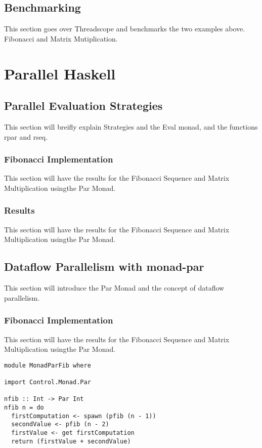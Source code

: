 \documentclass[a4paper, 10pt]{article}
\begin{document}
\subsection{Benchmarking}
This section goes over Threadscope and benchmarks the two examples above. Fibonacci and Matrix Mutiplication.

\section{Parallel Haskell}

\subsection{Parallel Evaluation Strategies}
This section will breifly explain Strategies and the Eval monad, and the functions rpar and rseq.

\subsubsection{Fibonacci Implementation}
This section will have the results for the Fibonacci Sequence and Matrix Multiplication usingthe Par Monad.

\subsubsection{Results}
This section will have the results for the Fibonacci Sequence and Matrix Multiplication usingthe Par Monad.

\subsection{Dataflow Parallelism with monad-par}
This section will introduce the Par Monad and the concept of dataflow parallelism.

\subsubsection{Fibonacci Implementation}
This section will have the results for the Fibonacci Sequence and Matrix Multiplication usingthe Par Monad.

\begin{lstlisting}
module MonadParFib where

import Control.Monad.Par

nfib :: Int -> Par Int
nfib n = do
  firstComputation <- spawn (pfib (n - 1))
  secondValue <- pfib (n - 2)
  firstValue <- get firstComputation
  return (firstValue + secondValue)
\end{lstlisting}
\end{document}
